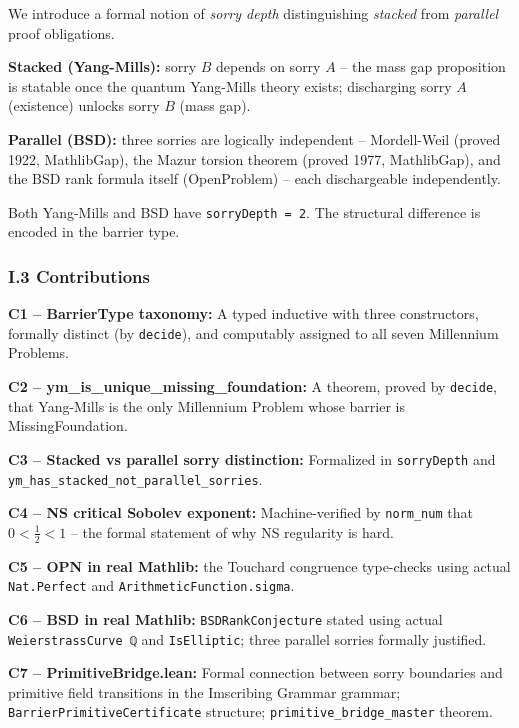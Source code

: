 \documentclass[12pt,a4paper]{article}
\begin{document}
We introduce a formal notion of \emph{sorry depth} distinguishing \emph{stacked} from \emph{parallel} proof obligations.

\textbf{Stacked (Yang-Mills):} sorry $B$ depends on sorry $A$  --  the mass gap proposition is statable once the quantum Yang-Mills theory exists; discharging sorry $A$ (existence) unlocks sorry $B$ (mass gap).

\textbf{Parallel (BSD):} three sorries are logically independent  --  Mordell-Weil (proved 1922, MathlibGap), the Mazur torsion theorem (proved 1977, MathlibGap), and the BSD rank formula itself (OpenProblem)  --  each dischargeable independently.

Both Yang-Mills and BSD have \texttt{sorryDepth = 2}. The structural difference is encoded in the barrier type.

\subsubsection{I.3 Contributions}

\textbf{C1  --  BarrierType taxonomy:} A typed inductive with three constructors, formally distinct (by \texttt{decide}), and computably assigned to all seven Millennium Problems.

\textbf{C2  --  ym\_is\_unique\_missing\_foundation:} A theorem, proved by \texttt{decide}, that Yang-Mills is the only Millennium Problem whose barrier is MissingFoundation.

\textbf{C3  --  Stacked vs parallel sorry distinction:} Formalized in \texttt{sorryDepth} and \texttt{ym\_has\_stacked\_not\_parallel\_sorries}.

\textbf{C4  --  NS critical Sobolev exponent:} Machine-verified by \texttt{norm\_num} that $0 < \frac{1}{2} < 1$  --  the formal statement of why NS regularity is hard.

\textbf{C5  --  OPN in real Mathlib:} the Touchard congruence type-checks using actual \texttt{Nat.Perfect} and \texttt{ArithmeticFunction.sigma}.

\textbf{C6  --  BSD in real Mathlib:} \texttt{BSDRankConjecture} stated using actual \texttt{WeierstrassCurve ℚ} and \texttt{IsElliptic}; three parallel sorries formally justified.

\textbf{C7  --  PrimitiveBridge.lean:} Formal connection between sorry boundaries and primitive field transitions in the Imscribing Grammar grammar; \texttt{BarrierPrimitiveCertificate} structure; \texttt{primitive\_bridge\_master} theorem.
\end{document}
